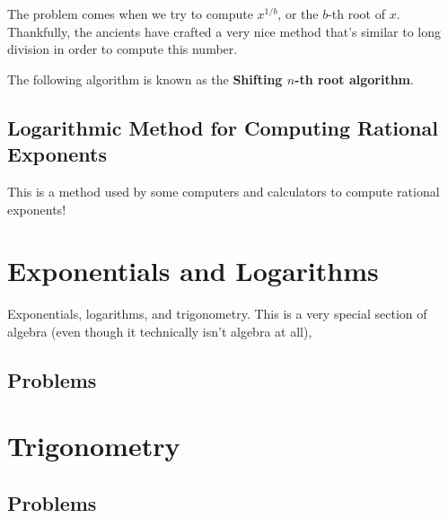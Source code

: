 \documentclass{scrbook}
\theoremstyle{definition}
\begin{document}
The problem comes when we try to compute $x^{1/b}$, or the $b$-th root of $x$. Thankfully, the ancients have crafted a very nice method that's similar to long division in order to compute this number. 

The following algorithm is known as the \textbf{Shifting $n$-th root algorithm}. 

\subsection{Logarithmic Method for Computing Rational Exponents}

This is a method used by some computers and calculators to compute rational exponents!

\section{Exponentials and Logarithms}

Exponentials, logarithms, and trigonometry. This is a very special section of algebra (even though it technically isn't algebra at all), 

\subsection{Problems}

\section{Trigonometry}

\subsection{Problems}

\printbibliography
\end{document}
